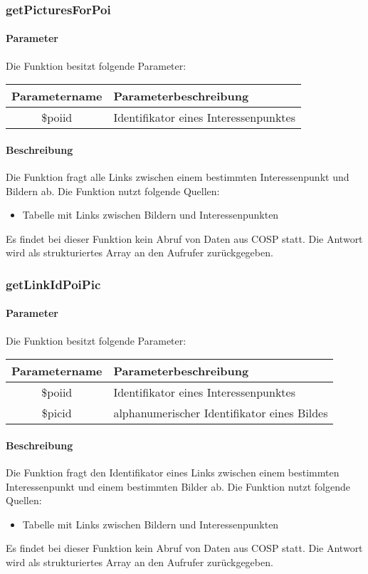 \subsubsection{getPicturesForPoi}
\paragraph{Parameter} Die Funktion besitzt folgende Parameter:
\begin{table}[H]
	\begin{tabular}{|c|p{11cm}|}
		\hline
		\textbf{Parametername} & \textbf{Parameterbeschreibung} \\ \hline
		\$poiid & Identifikator eines Interessenpunktes \\ \hline
	\end{tabular}
\end{table}
\paragraph{Beschreibung} Die Funktion fragt alle Links zwischen einem bestimmten Interessenpunkt und Bildern ab. Die Funktion nutzt folgende Quellen:
\begin{itemize}
	\item Tabelle mit Links zwischen Bildern und Interessenpunkten
\end{itemize}
Es findet bei dieser Funktion kein Abruf von Daten aus {\glqq COSP\grqq} statt. Die Antwort wird als strukturiertes Array an den Aufrufer zurückgegeben.
\subsubsection{getLinkIdPoiPic}
\paragraph{Parameter} Die Funktion besitzt folgende Parameter:
\begin{table}[H]
	\begin{tabular}{|c|p{11cm}|}
		\hline
		\textbf{Parametername} & \textbf{Parameterbeschreibung} \\ \hline
		\$poiid & Identifikator eines Interessenpunktes \\ \hline
		\$picid & alphanumerischer Identifikator eines Bildes \\ \hline
	\end{tabular}
\end{table}
\paragraph{Beschreibung} Die Funktion fragt den Identifikator eines Links zwischen einem bestimmten Interessenpunkt und einem bestimmten Bilder ab. Die Funktion nutzt folgende Quellen:
\begin{itemize}
	\item Tabelle mit Links zwischen Bildern und Interessenpunkten
\end{itemize}
Es findet bei dieser Funktion kein Abruf von Daten aus {\glqq COSP\grqq} statt. Die Antwort wird als strukturiertes Array an den Aufrufer zurückgegeben.
